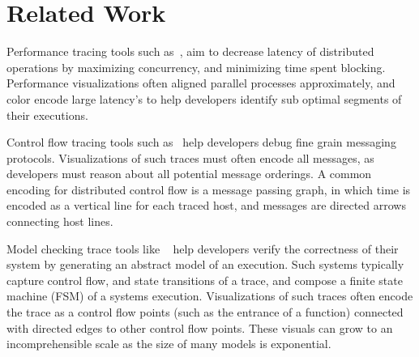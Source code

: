 \section{Related Work}
\label{sec:related}


Performance tracing tools such
as~\cite{tensorflow2015-whitepaper,36356,202574,Nagel96vampir:visualization,Zaki:1999:TSP:1080598.1080606},
aim to decrease latency of distributed operations by maximizing
concurrency, and minimizing time spent blocking. Performance
visualizations often aligned parallel processes approximately, and color
encode large latency's to help developers identify sub optimal
segments of their executions.

Control flow tracing tools such
as~\cite{DBLP:conf:icse:2016c,AbrahamsonBBE2014,5071901} help
developers debug fine grain messaging protocols. Visualizations of
such traces must often encode all messages, as developers must reason
about all potential message orderings. A common encoding for
distributed control flow is a message passing graph, in which time is
encoded as a vertical line for each traced host, and messages are
directed arrows connecting host lines.

Model checking trace tools like
~\cite{Beschastnikh:2014:IMC:2568225:2568246,Barham03magpie:online,Walker98visualizingdynamic}
help developers verify the correctness of their system by generating an
abstract model of an execution. Such systems typically capture control
flow, and state transitions of a trace, and compose a finite state
machine (FSM) of a systems execution. Visualizations of such traces
often encode the trace as a control flow points (such as the entrance
of a function) connected with directed edges to other control flow
points. These visuals can grow to an incomprehensible scale as the
size of many models is exponential.
